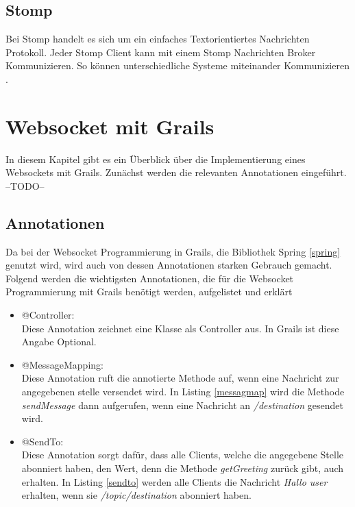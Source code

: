 \subsection{Stomp}

Bei Stomp handelt es sich um ein einfaches Textorientiertes Nachrichten Protokoll. Jeder Stomp Client kann mit einem Stomp Nachrichten Broker Kommunizieren. So können unterschiedliche Systeme miteinander Kommunizieren \cite{stomp}.

\section{Websocket mit Grails}

In diesem Kapitel gibt es ein Überblick über die Implementierung eines Websockets mit Grails. Zunächst werden die relevanten Annotationen eingeführt. 
--TODO--

\subsection{Annotationen}

Da bei der Websocket Programmierung in Grails, die Bibliothek Spring \ref{spring} genutzt wird, wird auch von dessen Annotationen starken Gebrauch gemacht. Folgend werden die wichtigsten Annotationen, die für die Websocket Programmierung mit Grails benötigt werden, aufgelistet und erklärt \cite{spring2017}

\begin{itemize}
	\item @Controller:\\	
	Diese Annotation zeichnet eine Klasse als Controller aus. In Grails ist diese Angabe Optional.
	
	\item @MessageMapping:\\
	Diese Annotation ruft die annotierte Methode auf, wenn eine Nachricht zur angegebenen stelle versendet wird. In Listing \ref{messagmap} wird die Methode \textit{sendMessage} dann aufgerufen, wenn eine Nachricht an \textit{/destination} gesendet wird. 
	   
	\item @SendTo:\\
	Diese Annotation sorgt dafür, dass alle Clients, welche die angegebene Stelle 	abonniert haben, den Wert, denn die Methode \textit{getGreeting} zurück gibt, auch erhalten. In Listing \ref{sendto} werden alle Clients die Nachricht \textit{Hallo user} erhalten, wenn sie \textit{/topic/destination} abonniert haben. 
    
    
\end{itemize} 

